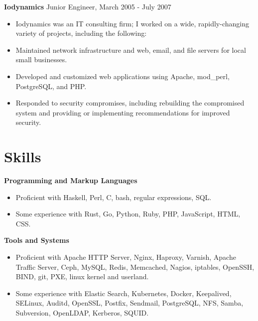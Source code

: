 \documentclass[line]{res}
\begin{document}
\begin{resume}
\textbf{Iodynamics} Junior Engineer, March 2005 - July 2007
\begin{itemize}
\item Iodynamics was an IT consulting firm; I worked on a wide, rapidly-changing variety of projects, including the following:
\item Maintained network infrastructure and web, email, and file servers for local small businesses.
\item Developed and customized web applications using Apache, mod\_perl, PostgreSQL, and PHP.
\item Responded to security compromises, including rebuilding the compromised system and providing or implementing recommendations for improved security.
\end{itemize}

\section{Skills}

\textbf{Programming and Markup Languages}
\begin{itemize}
\item Proficient with Haskell, Perl, C, bash, regular expressions, SQL.
\item Some experience with Rust, Go, Python, Ruby, PHP, JavaScript, HTML, CSS.
\end{itemize}

\textbf{Tools and Systems}
\begin{itemize}
\item Proficient with Apache HTTP Server, Nginx, Haproxy, Varnish, Apache Traffic Server, Ceph, MySQL, Redis, Memcached, Nagios, iptables, OpenSSH, BIND, git, PXE, linux kernel and userland.
\item Some experience with Elastic Search, Kubernetes, Docker, Keepalived, SELinux, Auditd, OpenSSL, Postfix, Sendmail, PostgreSQL, NFS, Samba, Subversion, OpenLDAP, Kerberos, SQUID.
\end{itemize}

\end{resume}
\end{document}

